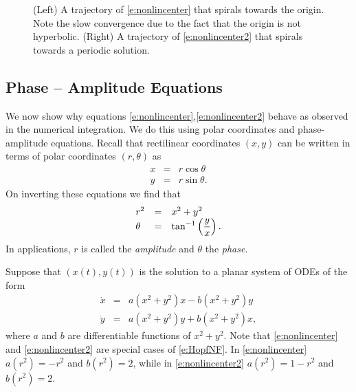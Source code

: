 \documentclass{ximera}
\begin{document}
\begin{figure*}[htb]
           \centerline{%
	   }
           \caption{(Left) A trajectory of \protect\eqref{e:nonlincenter}
that spirals towards the origin. Note the slow convergence due to the fact 
that the origin is not hyperbolic.  (Right) A trajectory of 
\protect\eqref{e:nonlincenter2} that spirals towards a periodic solution.}
           \label{F:nonlincenter}
\end{figure*}

\subsection*{Phase -- Amplitude Equations}

We now show why equations \eqref{e:nonlincenter},\eqref{e:nonlincenter2} 
behave as observed in the numerical integration.  We do this using 
polar coordinates and phase-amplitude equations.  
Recall that rectilinear coordinates $(x,y)$ can be written in terms 
of polar coordinates $(r,\theta)$ as
\begin{eqnarray*}
x & = & r\cos\theta\\
y & = & r\sin\theta.
\end{eqnarray*}
On inverting these equations we find that
\arraystart
\begin{equation} \label{e:polarccord}
\begin{array}{lcl}
r^2 & = & x^2+y^2  \\
\theta & = & \displaystyle\tan^{-1}\left(\frac{y}{x}\right). 
\end{array}
\end{equation}
\arrayfinish
In applications, $r$ is called the {\em amplitude\/} and 
$\theta$ the {\em phase\/}.

Suppose that $(x(t),y(t))$ is the solution to a planar system of
ODEs of the form 
\begin{equation} \label{e:HopfNF}
\begin{array}{rcl}
\dot{x} & = & a(x^2+y^2)x - b(x^2+y^2)y\\
\dot{y} & = & a(x^2+y^2)y + b(x^2+y^2)x,
\end{array}
\end{equation}
where $a$ and $b$ are differentiable functions of $x^2+y^2$.
Note that \eqref{e:nonlincenter} and \eqref{e:nonlincenter2} are special cases 
of \eqref{e:HopfNF}.  In \eqref{e:nonlincenter} $a(r^2)=-r^2$ and $b(r^2)=2$, 
while in \eqref{e:nonlincenter2} $a(r^2)=1-r^2$ and $b(r^2)=2$.
\end{document}
